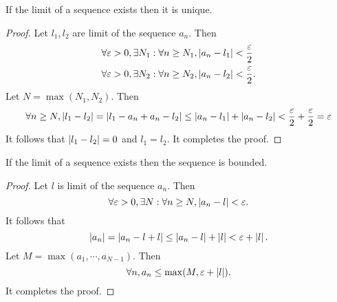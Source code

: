 
\begin{theorem}
  If the limit of a sequence exists then it is unique.
  \label{thm:lim_uniq}
\end{theorem}

\begin{proof}
  Let $l_1, l_2$ are limit of the sequence $a_n$. Then
  \begin{equation}
    \begin{split}
      &\forall \varepsilon > 0, \exists N_1:
      \forall n \ge N_1, \left| a_n - l_1 \right| < \frac{\varepsilon}{2} \\
      &\forall \varepsilon > 0, \exists N_2:
      \forall n \ge N_2, \left| a_n - l_2 \right| < \frac{\varepsilon}{2}.
    \end{split}
  \end{equation}
  Let $N = \max(N_1, N_2)$. Then
  \begin{equation}
    \forall n \ge N, \left| l_1 - l_2 \right|
    = \left| l_1 - a_n + a_n - l_2 \right|
    \le \left| a_n - l_1 \right| + \left| a_n - l_2 \right|
    < \frac{\varepsilon}{2} + \frac{\varepsilon}{2} = \varepsilon
  \end{equation}
  It follows that $\left| l_1 - l_2 \right| = 0$ and $l_1 = l_2$. It completes the proof.
\end{proof}


\begin{theorem}
  If the limit of a sequence exists then the sequence is bounded.
  \label{thm:lim_bou} %
\end{theorem}

\begin{proof}
  Let $l$ is limit of the sequence $a_n$. Then
  \begin{equation}
    \forall \varepsilon > 0, \exists N: \forall n \ge N, \left| a_n - l \right| < \varepsilon.
  \end{equation}
  It follows that
  \begin{equation}
    \left| a_n \right| = \left| a_n - l + l \right| \le \left| a_n - l \right| + \left| l \right| < \varepsilon + \left| l \right|.
  \end{equation}
  Let $M = \max(a_1, \cdots, a_{N-1})$. Then
  \begin{equation}
    \forall n, a_n \le \max (M, \varepsilon + \left| l \right|).
  \end{equation}
  It completes the proof.
\end{proof}

